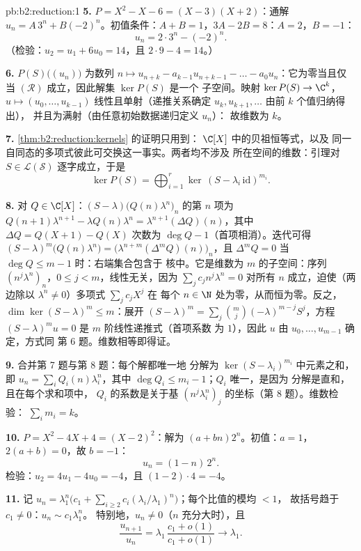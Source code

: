 \begin{solution}{pb:b2:reduction:1}
\textbf{5.} $P = X^2 - X - 6 = (X - 3)(X + 2)$：通解
$u_n = A\,3^n + B(-2)^n$。初值条件：$A + B = 1$，$3A -
2B = 8$：$A = 2$，$B = -1$：
\[
u_n = 2\cdot 3^n - (-2)^n .
\]
（检验：$u_2 = u_1 + 6u_0 = 14$，且 $2\cdot9 - 4 = 14$。）

\textbf{6.} $P(S)\bigl((u_n)\bigr)$ 为数列 $n \mapsto
u_{n+k} - a_{k-1}u_{n+k-1} - \dots - a_0u_n$：它为零当且仅当
$(\mathcal R)$ 成立，因此解集 $\ker P(S)$ 是一个
子空间。映射 $\ker P(S) \to \C^k$，$u \mapsto (u_0, \dots,
u_{k-1})$ 线性且单射（递推关系确定
$u_{k}, u_{k+1}, \dots$ 由前 $k$ 个值归纳得出），
并且为满射（由任意初始数据递归定义 $u_n$）：
故维数为 $k$。

\textbf{7.} \cref{thm:b2:reduction:kernels} 的证明只用到：
$\C[X]$ 中的贝祖恒等式，以及
同一自同态的多项式彼此可交换这一事实。两者均不涉及
所在空间的维数：引理对
$S \in \mathcal{L}(\mathcal{S})$ 逐字成立，于是
\[
\ker P(S) = \bigoplus_{i=1}^{r}
\ker\,(S - \lambda_i\,\mathrm{id})^{m_i}.
\]

\textbf{8.} 对 $Q \in \C[X]$：$(S -
\lambda)\bigl(Q(n)\lambda^n\bigr)_n$ 的第 $n$ 项为
$Q(n{+}1)\lambda^{n+1} - \lambda Q(n)\lambda^n =
\lambda^{n+1}(\Delta Q)(n)$，其中 $\Delta Q = Q(X{+}1) - Q(X)$
次数为 $\deg Q - 1$（首项相消）。迭代可得
$(S - \lambda)^m\bigl(Q(n)\lambda^n\bigr) =
\bigl(\lambda^{n+m}(\Delta^m Q)(n)\bigr)_n$，且 $\Delta^m Q = 0$
当 $\deg Q \leq m - 1$ 时：右端集合包含于
核中。它是维数为 $m$ 的子空间：序列
$(n^j\lambda^n)_n$，$0 \leq j < m$，线性无关，因为
$\sum_j c_j n^j\lambda^n = 0$ 对所有 $n$ 成立，迫使（两边除以
$\lambda^n \neq 0$）多项式 $\sum_j c_jX^j$ 在
每个 $n \in \N$ 处为零，从而恒为零。反之，$\dim\ker(S -
\lambda)^m \leq m$：展开 $(S - \lambda)^m = \sum_j
\binom mj(-\lambda)^{m-j}S^j$，方程 $(S - \lambda)^m u =
0$ 是 $m$ 阶线性递推式（首项系数
为 $1$），因此 $u$ 由 $u_0, \dots, u_{m-1}$ 确定，方式同
第 6 题。维数相等即得证。

\textbf{9.} 合并第 7 题与第 8 题：每个解都唯一地
分解为 $\ker(S -
\lambda_i)^{m_i}$ 中元素之和，即 $u_n = \sum_i Q_i(n)\lambda_i^n$，其中
$\deg Q_i \leq m_i - 1$；$Q_i$ 唯一，是因为
分解是直和，且在每个求和项中，
$Q_i$ 的系数是关于基
$(n^j\lambda_i^n)_j$ 的坐标（第 8 题）。维数检验：
$\sum_i m_i = k$。

\textbf{10.} $P = X^2 - 4X + 4 = (X - 2)^2$：解为 $(a +
bn)2^n$。初值：$a = 1$，$2(a + b) = 0$，故 $b = -1$：
\[
u_n = (1 - n)\,2^n .
\]
检验：$u_2 = 4u_1 - 4u_0 = -4$，且 $(1 - 2)\cdot4 = -4$。

\textbf{11.} 记 $u_n = \lambda_1^n\bigl(c_1 + \sum_{i\geq2}
c_i(\lambda_i/\lambda_1)^n\bigr)$；每个比值的模均 $< 1$，
故括号趋于 $c_1 \neq 0$：$u_n \sim c_1\lambda_1^n$。
特别地，$u_n \neq 0$（$n$ 充分大时），且
\[
\frac{u_{n+1}}{u_n} =
\lambda_1\,\frac{c_1 + o(1)}{c_1 + o(1)} \longrightarrow
\lambda_1 .
\]


\end{solution}

